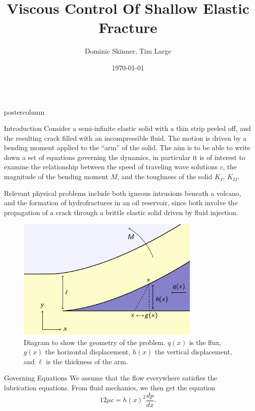 \documentclass{beamer}
\title{\huge Viscous Control Of Shallow Elastic Fracture}
\author{Dominic Skinner, Tim Large}
\institute[Univerity of Cambridge]
{DAMTP, University of Cambridge}
\date{\today}
\newlength{\columnheight}
\begin{document}
\begin{frame}
\begin{columns}
	\begin{column}{.43\textwidth}
		\begin{beamercolorbox}[center]{postercolumn}
			\begin{minipage}{.98\textwidth}  %
				\parbox[t][\columnheight]{\textwidth}{ %
\begin{myblock}{Introduction}
Consider a semi-infinite elastic solid with a thin strip peeled off, and the
resulting crack filled with an incompressible fluid. The motion is driven
by a bending moment applied to the ``arm'' of the solid. The aim is to be
able to write down a set of equations governing the dynamics, in particular
it is of interest to examine the relationship between the speed of traveling
wave solutions $c$, the magnitude of the bending moment $M$, and the toughness 
of the solid $K_I$, $K_{II}$. 

Relevant physical problems include both igneous intrusions beneath a volcano,
and the formation of hydrofractures in an oil
reservoir, since both involve the propagation of a crack through a brittle 
elastic solid driven by fluid injection.

\begin{figure}
\centering\includegraphics[width=0.8\textwidth]{../Fig10.pdf}
\caption{Diagram to show the geometry of the problem. $q(x)$ is the flux,
$g(x)$ the horizontal displacement, $h(x)$ the vertical displacement, and
$\ell$ is the thickness of the arm.}
\end{figure}
\end{myblock}\vfill
\begin{myblock}{Governing Equations}
We assume that the flow everywhere satisfies the lubrication equations. From 
fluid mechanics, we then get the equation
\[12\mu c = h(x)^2 \frac{dp}{dx}.\]


\end{myblock}}
\end{minipage}
\end{beamercolorbox}
\end{column}
\end{columns}
\end{frame}
\end{document}
